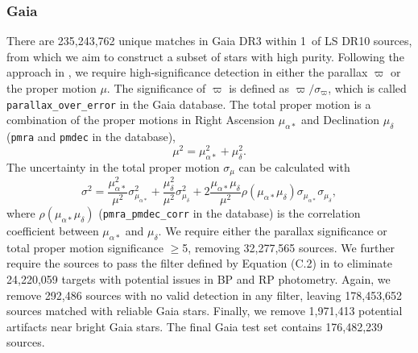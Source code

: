 \documentclass[twocolumn]{aastex631}
\newcommand{\dr}[1]{DR{#1}}
\begin{document}
\begin{CJK*}{UTF8}{gbsn}
\subsubsection{Gaia}\label{sec:Gaia}
There are 235,243,762 unique matches in Gaia \dr{3} within 1\arcsec\ of LS \dr{10} sources, from which we aim to construct a subset of stars with high purity. Following the approach in , we require high-significance detection in either the parallax $\varpi$ or the proper motion $\mu$. The significance of $\varpi$ is defined as $\varpi/\sigma_\varpi$, which is called {\tt parallax\_over\_error} in the Gaia database. The total proper motion is a combination of the proper motions in Right Ascension $\mu_{\alpha*}$ and Declination $\mu_\delta$ ({\tt pmra} and {\tt pmdec} in the database),
\begin{equation*}
    \mu^2 = \mu_{\alpha*}^2 + \mu_\delta^2.
\end{equation*}
The uncertainty in the total proper motion $\sigma_\mu$ can be calculated with
\begin{equation*}
    \sigma^2 = \frac{\mu_{\alpha*}^2}{\mu^2}\sigma_{\mu_{\alpha*}}^2 + \frac{\mu_{\delta}^2}{\mu^2}\sigma_{\mu_{\delta}}^2 + 2\frac{\mu_{\alpha*}\mu_\delta}{\mu^2}\rho(\mu_{\alpha*}\mu_\delta)\sigma_{\mu_{\alpha*}}\sigma_{\mu_{\delta}},
\end{equation*}
where $\rho(\mu_{\alpha*}\mu_\delta)$ ({\tt pmra\_pmdec\_corr} in the database) is the correlation coefficient between $\mu_{\alpha*}$ and $\mu_\delta$. We require either the parallax significance or total proper motion significance $\ge$5, removing 32,277,565 sources. 
We further require the sources to pass the filter defined by Equation (C.2) in \cite{Lindegren_2018} to eliminate 24,220,059 targets with potential issues in BP and RP photometry.
Again, we remove 292,486 sources with no valid detection in any filter, leaving 178,453,652 sources matched with reliable Gaia stars. Finally, we remove 1,971,413 potential artifacts near bright Gaia stars. The final Gaia test set contains 176,482,239 sources.


\end{CJK*}
\end{document}
